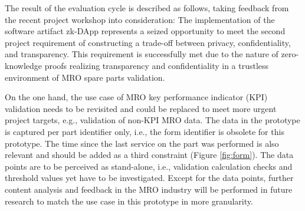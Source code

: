 The result of the evaluation cycle is described as follows, taking feedback from the recent project workshop into consideration: The implementation of the software artifact zk-DApp represents a seized opportunity to meet the second project requirement of constructing a trade-off between privacy, confidentiality, and transparency. This requirement is successfully met due to the nature of zero-knowledge proofs realizing transparency and confidentiality in a trustless environment of MRO spare parts validation. 

On the one hand, the use case of MRO key performance indicator (KPI) validation needs to be revisited and could be replaced to meet more urgent project targets, e.g., validation of non-KPI MRO data. The data in the prototype is captured per part identifier only, i.e., the form identifier is obsolete for this prototype. The time since the last service on the part was performed is also relevant and should be added as a third constraint (Figure \ref{fig:form}). The data points are to be perceived as stand-alone, i.e., validation calculation checks and threshold values yet have to be investigated. Except for the data points, further content analysis and feedback in the MRO industry will be performed in future research to match the use case in this prototype in more granularity.

